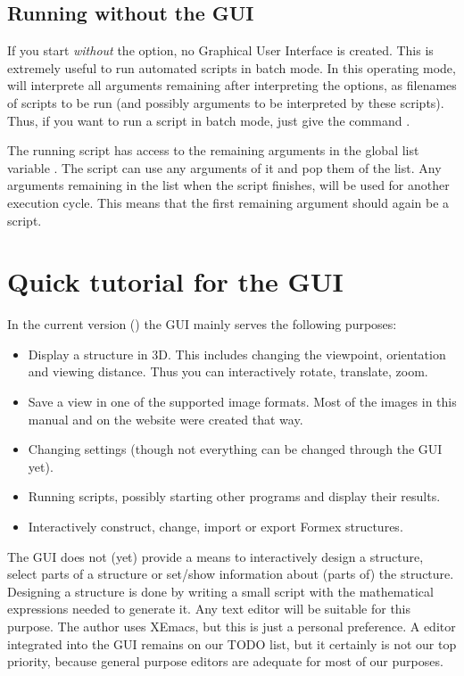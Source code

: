 \subsection{Running \pyFormex without the GUI}
If you start \pyf \emph{without} the  option, no Graphical User Interface is created. This is extremely useful to run automated scripts in batch mode. In this operating mode, \pyf will interprete all arguments remaining after interpreting the options, as filenames of scripts to be run (and possibly arguments to be interpreted by these scripts).
Thus, if you want to run a \pyf script  in batch mode, just give the command .

The running script has access to the remaining arguments in the global list variable . The script can use any arguments of it and pop them of the list. Any arguments remaining in the  list when the script finishes, will be used for another \pyf execution cycle. This means that the first remaining argument should again be a \pyf script.
 

\section{Quick tutorial for the \pyformex GUI}
\label{sec:gui-tutorial}
In the current version (\version) the GUI mainly serves the following purposes:
\begin{itemize}
\item Display a structure in 3D. This includes changing the viewpoint, orientation and viewing distance. Thus you can interactively rotate, translate, zoom.
\item Save a view in one of the supported image formats. Most of the images in this manual and on the \pyformex{} website were created that way. 
\item Changing \pyformex settings (though not everything can be changed through the GUI yet).
\item Running \pyformex scripts, possibly starting other programs and display their results.
\item Interactively construct, change, import or export Formex structures. 
\end{itemize}

The GUI does not (yet) provide a means to interactively design a structure, select parts of a structure or set/show information about (parts of) the structure. Designing a structure is done by writing a small script with the mathematical expressions needed to generate it. Any text editor will be suitable for this purpose. The author uses XEmacs, but this is just a personal preference. 
A \pyformex editor integrated into the GUI remains on our TODO list, but it certainly is not our top priority, because general purpose editors are adequate for most of our purposes. 

